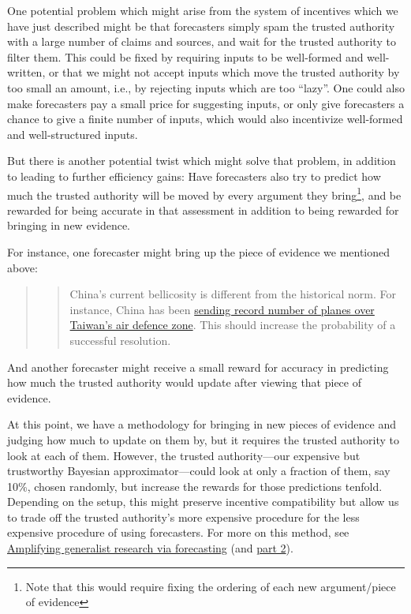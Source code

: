 \documentclass[]{article}
\begin{document}
One potential problem which might arise from the system of incentives
which we have just described might be that forecasters simply spam the
trusted authority with a large number of claims and sources, and wait
for the trusted authority to filter them. This could be fixed by
requiring inputs to be well-formed and well-written, or that we might
not accept inputs which move the trusted authority by too small an
amount, i.e., by rejecting inputs which are too ``lazy''. One could also
make forecasters pay a small price for suggesting inputs, or only give
forecasters a chance to give a finite number of inputs, which would also
incentivize well-formed and well-structured inputs.

But there is another potential twist which might solve that problem, in
addition to leading to further efficiency gains: Have forecasters also
try to predict how much the trusted authority will be moved by every
argument they
bring\footnote{Note that this would require fixing the ordering of each new argument/piece of evidence},
and be rewarded for being accurate in that assessment in addition to
being rewarded for bringing in new evidence.

For instance, one forecaster might bring up the piece of evidence we
mentioned above:

\begin{quote}
\begin{quote}
China's current bellicosity is different from the historical norm. For
instance, China has been
\href{https://www.bbc.co.uk/news/world-asia-58794094}{sending record
number of planes over Taiwan's air defence zone}. This should increase
the probability of a successful resolution.
\end{quote}
\end{quote}

And another forecaster might receive a small reward for accuracy in
predicting how much the trusted authority would update after viewing
that piece of evidence.

At this point, we have a methodology for bringing in new pieces of
evidence and judging how much to update on them by, but it requires the
trusted authority to look at each of them. However, the trusted
authority---our expensive but trustworthy Bayesian approximator---could
look at only a fraction of them, say 10\%, chosen randomly, but increase
the rewards for those predictions tenfold. Depending on the setup, this
might preserve incentive compatibility but allow us to trade off the
trusted authority's more expensive procedure for the less expensive
procedure of using forecasters. For more on this method, see
\href{https://www.lesswrong.com/posts/cLtdcxu9E4noRSons/part-1-amplifying-generalist-research-via-forecasting}{Amplifying
generalist research via forecasting} (and
\href{https://www.lesswrong.com/posts/FeE9nR7RPZrLtsYzD/part-2-amplifying-generalist-research-via-forecasting}{part
2}).
\end{document}

